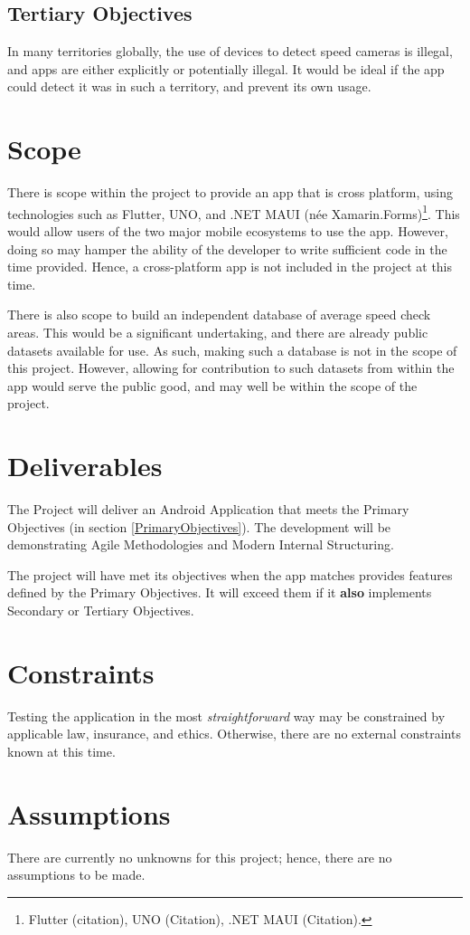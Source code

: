 \documentclass[11pt, a4paper, notitlepage]{report}
\begin{document}
\subsection{Tertiary Objectives}
In many territories globally, the use of devices to detect speed cameras is 
illegal, and apps are either explicitly or potentially illegal. It would be 
ideal if the app could detect it was in such a territory, and prevent its own 
usage.

\section{Scope}
There is scope within the project to provide an app that is cross 
platform, using technologies such as Flutter, UNO, and .NET MAUI (née 
Xamarin.Forms)\footnote{Flutter (citation), UNO (Citation), .NET MAUI (Citation).}. 
This would allow users of the two major mobile ecosystems to use the app. 
However, doing so may hamper the ability of the developer to write sufficient 
code in the time provided.
Hence, a cross-platform app is not included in the project at this time.

There is also scope to build an independent database of average speed check 
areas. This would be a significant undertaking, and there are already public 
datasets available for use. As such, making such a database is not in the scope %
of this project. However, allowing for contribution to such datasets from 
within the app would serve the public good, and may well be within the scope of 
the project.

\section{Deliverables}
The Project will deliver an Android Application that meets the Primary 
Objectives (in section \ref{PrimaryObjectives}). The development will be 
demonstrating Agile Methodologies and Modern Internal Structuring.

The project will have met its objectives when the app matches provides 
features defined by the Primary Objectives. It will exceed them if it 
\textbf{also} implements Secondary or Tertiary Objectives.

\section{Constraints}
Testing the application in the most \textit{straightforward} way may be 
constrained by applicable law, insurance, and ethics. Otherwise, there are no 
external constraints known at this time.

\section{Assumptions}
There are currently no unknowns for this project; hence, there are no 
assumptions to be made.
\end{document}
